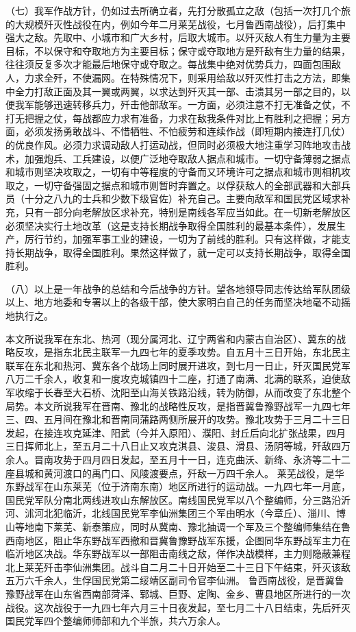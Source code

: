 （七）我军作战方针，仍如过去所确立者，先打分散孤立之敌（包括一次打几个旅的大规模歼灭性战役在内，例如今年二月莱芜战役，七月鲁西南战役），后打集中强大之敌。先取中、小城市和广大乡村，后取大城市。以歼灭敌人有生力量为主要目标，不以保守和夺取地方为主要目标；保守或夺取地方是歼敌有生力量的结果，往往须反复多次才能最后地保守或夺取之。每战集中绝对优势兵力，四面包围敌人，力求全歼，不使漏网。在特殊情况下，则采用给敌以歼灭性打击之方法，即集中全力打敌正面及其一翼或两翼，以求达到歼灭其一部、击溃其另一部之目的，以便我军能够迅速转移兵力，歼击他部敌军。一方面，必须注意不打无准备之仗，不打无把握之仗，每战都应力求有准备，力求在敌我条件对比上有胜利之把握；另方面，必须发扬勇敢战斗、不惜牺牲、不怕疲劳和连续作战（即短期内接连打几仗）的优良作风。必须力求调动敌人打运动战，但同时必须极大地注重学习阵地攻击战术，加强炮兵、工兵建设，以便广泛地夺取敌人据点和城市。一切守备薄弱之据点和城市则坚决攻取之，一切有中等程度的守备而又环境许可之据点和城市则相机攻取之，一切守备强固之据点和城市则暂时弃置之。以俘获敌人的全部武器和大部兵员（十分之八九的士兵和少数下级官佐）补充自己。主要向敌军和国民党区域求补充，只有一部分向老解放区求补充，特别是南线各军应当如此。在一切新老解放区必须坚决实行土地改革（这是支持长期战争取得全国胜利的最基本条件），发展生产，厉行节约，加强军事工业的建设，一切为了前线的胜利。只有这样做，才能支持长期战争，取得全国胜利。果然这样做了，就一定可以支持长期战争，取得全国胜利。

（八）以上是一年战争的总结和今后战争的方针。望各地领导同志传达给军队团级以上、地方地委和专署以上的各级干部，使大家明白自己的任务而坚决地毫不动摇地执行之。


\begin{maonote}
本文所说我军在东北、热河（现分属河北、辽宁两省和内蒙古自治区）、冀东的战略反攻，是指东北民主联军一九四七年的夏季攻势。自五月十三日开始，东北民主联军在东北和热河、冀东各个战场上同时展开进攻，到七月一日止，歼灭国民党军八万二千余人，收复和一度攻克城镇四十二座，打通了南满、北满的联系，迫使敌军收缩于长春至大石桥、沈阳至山海关铁路沿线，转为防御，从而改变了东北整个局势。本文所说我军在晋南、豫北的战略性反攻，是指晋冀鲁豫野战军一九四七年三、四、五月间在豫北和晋南同蒲路两侧所展开的攻势。豫北攻势于三月二十三日发起，在接连攻克延津、阳武（今并入原阳）、濮阳、封丘后向北扩张战果，四月三日挥师北上，至五月二十八日止又攻克淇县、浚县、滑县、汤阴等城，歼敌四万余人。晋南攻势于四月四日发起，至五月十一日，连克曲沃、新绛、永济等二十二座县城和黄河渡口的禹门口、风陵渡要点，歼敌一万四千余人。
莱芜战役，是华东野战军在山东莱芜（位于济南东南）地区所进行的运动战。一九四七年一月底，国民党军队分南北两线进攻山东解放区。南线国民党军以八个整编师，分三路沿沂河、沭河北犯临沂，北线国民党军李仙洲集团三个军由明水（今章丘）、淄川、博山等地南下莱芜、新泰策应，同时从冀南、豫北抽调一个军及三个整编师集结在鲁西南地区，阻止华东野战军西撤和晋冀鲁豫野战军东援，企图同华东野战军主力在临沂地区决战。华东野战军以一部阻击南线之敌，佯作决战模样，主力则隐蔽兼程北上莱芜歼击李仙洲集团。战斗自二月二十日开始至二十三日下午结束，歼灭该敌五万六千余人，生俘国民党第二绥靖区副司令官李仙洲。
鲁西南战役，是晋冀鲁豫野战军在山东省西南部菏泽、郓城、巨野、定陶、金乡、曹县地区所进行的一次战役。这次战役于一九四七年六月三十日夜发起，至七月二十八日结束，先后歼灭国民党军四个整编师师部和九个半旅，共六万余人。
\end{maonote}
